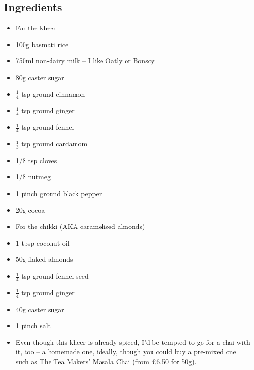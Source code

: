 \documentclass{book}
\begin{document}
\subsection*{Ingredients}
\begin{itemize}
\item For the kheer
\item 100g basmati rice
\item 750ml non-dairy milk – I like Oatly or Bonsoy
\item 80g caster sugar
\item $\frac{1}{4}$ tsp ground cinnamon
\item $\frac{1}{4}$ tsp ground ginger
\item $\frac{1}{4}$ tsp ground fennel
\item $\frac{1}{3}$ tsp ground cardamom
\item 1/8 tsp cloves
\item 1/8 nutmeg
\item 1 pinch ground black pepper
\item 20g cocoa
\end{itemize}

\begin{itemize}
\item For the chikki (AKA caramelised almonds)
\item 1 tbsp coconut oil
\item 50g flaked almonds
\item $\frac{1}{4}$ tsp ground fennel seed
\item $\frac{1}{4}$ tsp ground ginger
\item 40g caster sugar
\item 1 pinch salt
\end{itemize}

\begin{itemize}
\item  Even though this kheer is already spiced, I’d be tempted to go for a chai with it, too – a homemade one, ideally, though you could buy a pre-mixed one such as The Tea Makers’ Masala Chai (from £6.50 for 50g).
\end{itemize}
\end{document}
